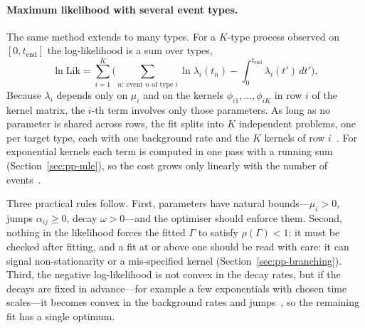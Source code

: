 \paragraph{Maximum likelihood with several event types.} The same method extends to many types. For a $K$-type process observed on $[0, t_{\text{end}}]$ the
log-likelihood is a sum over types,
\begin{equation}
  \ln \mathrm{Lik} = \sum_{i=1}^{K} \Big( \sum_{n:\ \text{event } n \text{ of type } i} \ln \lambda_i(t_n)
  - \int_0^{t_{\text{end}}} \lambda_i(t')\, dt' \Big),
\end{equation}
Because $\lambda_i$ depends only on $\mu_i$ and on the kernels $\phi_{i1}, \dots, \phi_{iK}$ in row
$i$ of the kernel matrix, the $i$-th term involves only those parameters. As long as no parameter is
shared across rows, the fit splits into $K$ independent problems, one per target type, each with
one background rate and the $K$ kernels of row $i$~\citep{wu2019qrhawkes,bacry2015}. For exponential kernels each
term is computed in one pass with a running sum (Section~\ref{sec:pp-mle}), so the cost grows only
linearly with the number of events~\citep{bacry2015}.

Three practical rules follow. First, parameters have natural bounds---$\mu_i > 0$, jumps
$\alpha_{ij} \ge 0$, decay $\omega > 0$---and the optimiser should enforce them. Second, nothing in the
likelihood forces the fitted $\Gamma$ to satisfy $\rho(\Gamma) < 1$; it must be checked after fitting,
and a fit at or above one should be read with care: it can signal non-stationarity or a mis-specified
kernel (Section~\ref{sec:pp-branching}). Third, the negative log-likelihood is not convex in the decay
rates, but if the decays are fixed in advance---for example a few exponentials with chosen time
scales---it becomes convex in the background rates and jumps~\citep{wu2019qrhawkes}, so the remaining
fit has a single optimum.

